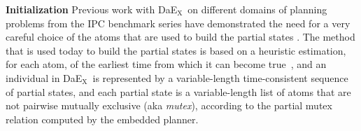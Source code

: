 \documentclass{llncs}
\def\DAEX{{\sc DaE$_{\text{X}}$}}
\renewcommand{\paragraph}[1]{{\bf #1}}
\begin{document}
\paragraph{Initialization} Previous work with \DAEX\ on different domains of planning problems from the
IPC benchmark series have demonstrated the need for a very careful choice of the atoms that are used to build the partial states \cite{bibai-EvoCOP2010}. 
The method that is used today to build the partial states is based on a heuristic estimation, for each atom, of the earliest time from which it can become true~\cite{Haslum2000}, 
%
and an individual in \DAEX\ is represented by a variable-length time-consistent sequence of partial states, and each partial state is a variable-length list of atoms that are not pairwise mutually exclusive (aka {\em mutex}), according to the partial mutex relation computed by the embedded planner. 

\end{document}

